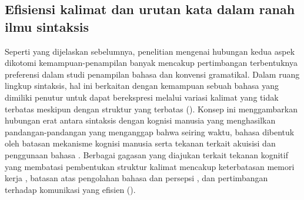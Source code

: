 \subsection{Efisiensi kalimat dan urutan kata dalam ranah ilmu sintaksis}
Seperti yang dijelaskan sebelumnya, penelitian mengenai hubungan kedua aspek dikotomi kemampuan-penampilan banyak mencakup pertimbangan terbentuknya preferensi dalam studi penampilan bahasa dan konvensi gramatikal. Dalam ruang lingkup sintaksis, hal ini berkaitan dengan kemampuan sebuah bahasa yang dimiliki penutur untuk dapat berekspresi melalui variasi kalimat yang tidak terbatas meskipun dengan struktur yang terbatas (\citealp{von1972origin, plotkin2000language}). Konsep ini menggambarkan hubungan erat antara sintaksis dengan kognisi manusia yang menghasilkan pandangan-pandangan yang menganggap bahwa seiring waktu, bahasa dibentuk oleh batasan mekanisme kognisi manusia serta tekanan terkait akuisisi dan penggunaan bahasa \citep{plotkin2000language}. Berbagai gagasan yang diajukan terkait tekanan kognitif yang membatasi pembentukan struktur kalimat mencakup keterbatasan memori kerja \citep{slobin1973cognitive}, batasan atas pengolahan bahasa dan persepsi \citep{bever1970cognitive}, dan pertimbangan terhadap komunikasi yang efisien (\citealp{macwhinneybates1989cross, givon1991markedness, zipf1949human}). 


